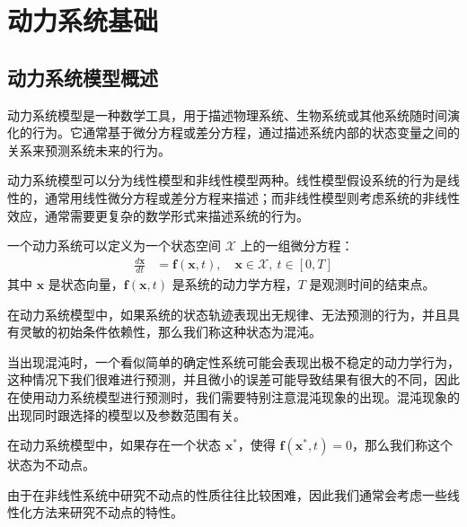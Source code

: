 \chapter{动力系统基础}\label{chap:dynamic}


\section{动力系统模型概述}
动力系统模型是一种数学工具，用于描述物理系统、生物系统或其他系统随时间演化的行为。它通常基于微分方程或差分方程，通过描述系统内部的状态变量之间的关系来预测系统未来的行为。

动力系统模型可以分为线性模型和非线性模型两种。线性模型假设系统的行为是线性的，通常用线性微分方程或差分方程来描述；而非线性模型则考虑系统的非线性效应，通常需要更复杂的数学形式来描述系统的行为。

\begin{defn}[动力系统]
一个动力系统可以定义为一个状态空间 $\mathcal{X}$ 上的一组微分方程：
\begin{align}
\frac{d\mathbf{x}}{dt} &= \mathbf{f}(\mathbf{x}, t), \quad \mathbf{x} \in \mathcal{X}, \ t \in [0, T]
\end{align}
其中 $\mathbf{x}$ 是状态向量，$\mathbf{f}(\mathbf{x}, t)$ 是系统的动力学方程，$T$ 是观测时间的结束点。
\end{defn}

\begin{defn}[混沌]
    在动力系统模型中，如果系统的状态轨迹表现出无规律、无法预测的行为，并且具有灵敏的初始条件依赖性，那么我们称这种状态为混沌。
\end{defn}

当出现混沌时，一个看似简单的确定性系统可能会表现出极不稳定的动力学行为，这种情况下我们很难进行预测，并且微小的误差可能导致结果有很大的不同，因此在使用动力系统模型进行预测时，我们需要特别注意混沌现象的出现。混沌现象的出现同时跟选择的模型以及参数范围有关。

\begin{defn}[不动点]
    在动力系统模型中，如果存在一个状态 $\mathbf{x}^*$，使得 $\mathbf{f}(\mathbf{x}^*, t) = 0$，那么我们称这个状态为不动点。
\end{defn}

由于在非线性系统中研究不动点的性质往往比较困难，因此我们通常会考虑一些线性化方法来研究不动点的特性。

